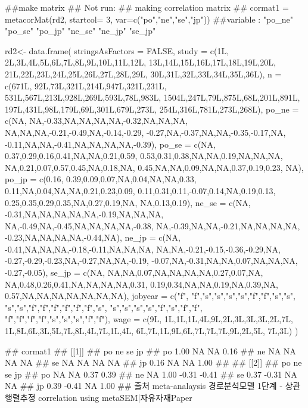 \documentclass[a4paper]{book}
\begin{document}
\begin{Examples}
\begin{ExampleCode}
##make matrix
## Not run: 
 ## making correlation matrix ##
cormat1 = metacorMat(rd2, startcol= 3, var=c("po","ne","se","jp"))
 ##variable : "po_ne" "po_se" "po_jp" "ne_se" "ne_jp" "se_jp"

rd2<- data.frame(
  stringsAsFactors = FALSE,
  study = c(1L,
            2L,3L,4L,5L,6L,7L,8L,9L,10L,11L,12L,
            13L,14L,15L,16L,17L,18L,19L,20L,
            21L,22L,23L,24L,25L,26L,27L,28L,29L,
            30L,31L,32L,33L,34L,35L,36L),
  n = c(671L,
        92L,73L,321L,214L,947L,321L,231L,
        531L,567L,213L,928L,269L,593L,78L,983L,
        1504L,247L,79L,875L,68L,201L,891L,
        197L,431L,98L,179L,69L,301L,679L,273L,
        254L,316L,781L,273L,268L),
  po_ne = c(NA,
            NA,-0.33,NA,NA,NA,NA,-0.32,NA,NA,NA,
            NA,NA,NA,-0.21,-0.49,NA,-0.14,-0.29,
            -0.27,NA,-0.37,NA,NA,-0.35,-0.17,NA,
            -0.11,NA,NA,-0.41,NA,NA,NA,NA,-0.39),
  po_se = c(NA,
            0.37,0.29,0.16,0.41,NA,NA,0.21,0.59,
            0.53,0.31,0.38,NA,NA,0.19,NA,NA,NA,
            NA,0.21,0.07,0.57,0.45,NA,0.18,NA,
            0.45,NA,NA,0.09,NA,NA,0.37,0.19,0.23,
            NA),
  po_jp = c(0.16,
            0.39,0.09,0.07,NA,0.04,NA,NA,0.33,
            0.11,NA,0.04,NA,NA,0.21,0.23,0.09,
            0.11,0.31,0.11,-0.07,0.14,NA,0.19,0.13,
            0.25,0.35,0.29,0.35,NA,0.27,0.19,NA,
            NA,0.13,0.19),
  ne_se = c(NA,
            -0.31,NA,NA,NA,NA,NA,-0.19,NA,NA,NA,
            NA,-0.49,NA,-0.45,NA,NA,NA,NA,-0.38,
            NA,-0.39,NA,NA,-0.21,NA,NA,NA,NA,
            -0.23,NA,NA,NA,NA,-0.44,NA),
  ne_jp = c(NA,
            -0.41,NA,NA,NA,-0.18,-0.11,NA,NA,NA,
            NA,NA,-0.21,-0.15,-0.36,-0.29,NA,
            -0.27,-0.29,-0.23,NA,-0.27,NA,NA,-0.19,
            -0.07,NA,-0.31,NA,NA,0.07,NA,NA,NA,
            -0.27,-0.05),
  se_jp = c(NA,
            NA,NA,0.07,NA,NA,NA,NA,0.27,0.07,NA,
            NA,0.48,0.26,0.41,NA,NA,NA,NA,0.31,
            0.19,0.34,NA,NA,0.19,NA,0.39,NA,
            0.57,NA,NA,NA,NA,NA,NA,NA),
  jobyear = c("f",
              "f","s","s","s","s","f","f","s","s",
              "s","s","f","f","f","f","f","f","s",
              "s","s","s","s","f","s","f","f",
              "f","f","f","f","s","s","s","f","f"),
  wage = c(9L,
           1L,1L,1L,4L,9L,2L,3L,3L,3L,2L,7L,
           1L,8L,6L,3L,5L,7L,8L,4L,7L,1L,4L,
           6L,7L,1L,9L,6L,7L,7L,7L,9L,2L,5L,
           7L,3L)
)

## cormat1
## [[1]]
## po ne se   jp
## po 1.00 NA NA 0.16
## ne   NA NA NA   NA
## se   NA NA NA   NA
## jp 0.16 NA NA 1.00
##
## [[2]]
## po    ne    se    jp
## po   NA    NA  0.37  0.39
## ne   NA  1.00 -0.31 -0.41
## se 0.37 -0.31    NA    NA
## jp 0.39 -0.41    NA  1.00
## 출처 meta-analaysis 경로분석모델 1단계 - 상관행렬추정 correlation using metaSEM|자유자재Paper


\end{ExampleCode}
\end{Examples}
\end{document}
